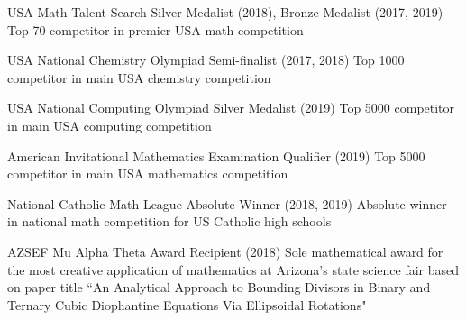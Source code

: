 
     \cventry 
        {}
        {USA Math Talent Search Silver Medalist (2018), Bronze Medalist (2017, 2019)}
        {}
        {}
        {Top 70 competitor in premier USA math competition}

        
    \cventry 
        {}
        {USA National Chemistry Olympiad Semi-finalist (2017, 2018)}
        {}
        {}
        {Top 1000 competitor in main USA chemistry competition}
    
        
    \cventry 
        {}
        {USA National Computing Olympiad Silver Medalist (2019)}
        {}
        {}
        {Top 5000 competitor in main USA computing competition}
        
         \cventry 
        {}
        {American Invitational Mathematics Examination Qualifier (2019)}
        {}
        {}
        {Top 5000 competitor in main USA mathematics competition}
    
    \cventry 
        {}
        {National Catholic Math League Absolute Winner (2018, 2019)}
        {}
        {}
        {Absolute winner in national math competition for US Catholic high schools}
    
    \cventry 
        {}
        {AZSEF Mu Alpha Theta Award Recipient (2018)}
        {}
        {}
        {Sole mathematical award for the most creative application of mathematics at Arizona's state science fair based on paper title ``An Analytical Approach to Bounding Divisors in Binary and Ternary Cubic Diophantine Equations Via Ellipsoidal Rotations"}
    